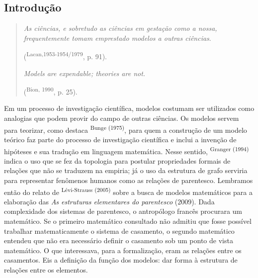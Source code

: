 \vspace*{-1.6mm}
{\noindent\fontsize{9}{10.8}\selectfont{Recebido em: 24/1/2014;
Aceito em: 19/3/2014.}}
\begin{multicols}{2}
\section*{Introdução}
\begin{quote}\par{}\textit{As ciências,\allowbreak{} e sobretudo as ciências em gestação como a nossa,\allowbreak{} frequentemente tomam emprestado modelos a outras ciências}.\allowbreak{}\par{}(\allowbreak{}\textsuperscript{Lacan,\allowbreak{}1953-\allowbreak{}1954\fshyp{}1979},\allowbreak{} p.\allowbreak{} 91)\allowbreak{}.\allowbreak{}\par{}\textit{Models are expendable; theories are not.\allowbreak{} }\par{}(\allowbreak{}\textsuperscript{Bion,\allowbreak{} 1990},\allowbreak{} p.\allowbreak{} 25)\allowbreak{}.\allowbreak{}\end{quote}\par{}Em um processo de investigação científica,\allowbreak{} modelos costumam ser utilizados como analogias que podem provir do campo de outras ciências.\allowbreak{} Os modelos servem para teorizar,\allowbreak{} como destaca \textsuperscript{Bunge (\allowbreak{}1975)\allowbreak{}},\allowbreak{} para quem a construção de um modelo teórico faz parte do processo de investigação científica e inclui a invenção de hipóteses e sua tradução em linguagem matemática.\allowbreak{} Nesse sentido,\allowbreak{} \textsuperscript{Granger (\allowbreak{}1994)\allowbreak{}} indica o uso que se fez da topologia para postular propriedades formais de relações que não se traduzem na empiria; já o uso da estrutura de grafo serviria para representar fenômenos humanos como as relações de parentesco.\allowbreak{} Lembramos então do relato de \textsuperscript{Lévi-\allowbreak{}Strauss (\allowbreak{}2005)\allowbreak{}} sobre a busca de modelos matemáticos para a elaboração das \textit{As estruturas elementares do parentesco} (\allowbreak{}2009)\allowbreak{}.\allowbreak{} Dada complexidade dos sistemas de parentesco,\allowbreak{} o antropólogo francês procurara um matemático.\allowbreak{} Se o primeiro matemático consultado não admitiu que fosse possível trabalhar matematicamente o sistema de casamento,\allowbreak{} o segundo matemático entendeu que não era necessário definir o casamento sob um ponto de vista matemático.\allowbreak{} O que interessava,\allowbreak{} para a formalização,\allowbreak{} eram as relações entre os casamentos.\allowbreak{} Eis a definição da função dos modelos:\allowbreak{} dar forma à estrutura de relações entre os elementos.

\end{multicols}
